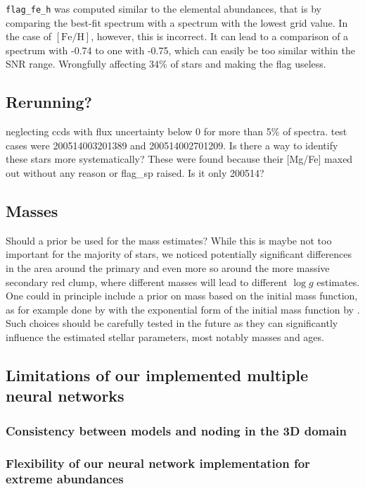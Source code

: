 \documentclass[
  journal=pasa,
  manuscript=research-paper, %
  year=2023,
  volume=37
]{cup-journal}
\newcommand{\feh}{$\mathrm{[Fe/H]}$\xspace}
\begin{document}
\texttt{flag\_fe\_h} was computed similar to the elemental abundances, that is by comparing the best-fit spectrum with a spectrum with the lowest grid value. In the case of \feh, however, this is incorrect. It can lead to a comparison of a spectrum with -0.74 to one with -0.75, which can easily be too similar within the SNR range. Wrongfully affecting 34\% of stars and making the flag useless.

\subsection{Rerunning?}

neglecting ccds with flux uncertainty below 0 for more than 5\% of spectra. test cases were 200514003201389 and 200514002701209. Is there a way to identify these stars more systematically? These were found because their [Mg/Fe] maxed out without any reason or flag\_sp raised. Is it only 200514?

\subsection{Masses}

Should a prior be used for the mass estimates? While this is maybe not too important for the majority of stars, we noticed potentially significant differences in the area around the primary and even more so around the more massive secondary red clump, where different masses will lead to different $\log g$ estimates. One could in principle include a prior on mass based on the initial mass function, as for example done by \citet{Sharma2018} with the exponential form of the initial mass function by \citet{Chabrier2001}. Such choices should be carefully tested in the future as they can significantly influence the estimated stellar parameters, most notably masses and ages.

\subsection{Limitations of our implemented multiple neural networks}

\subsubsection{Consistency between models and noding in the 3D domain}

\subsubsection{Flexibility of our neural network implementation for extreme abundances}
\end{document}
